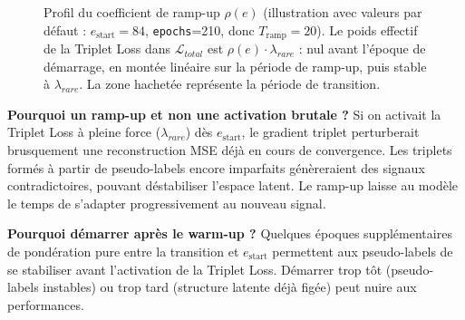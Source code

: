 \documentclass[11pt,a4paper]{article}
\begin{document}
\begin{figure}[H]
{%
}
\caption{Profil du coefficient de ramp-up $\rho(e)$ (illustration avec valeurs par d\'efaut : $e_{\text{start}}=84$, \texttt{epochs}=210, donc $T_{\text{ramp}}=20$). Le poids effectif de la Triplet Loss dans $\mathcal{L}_{total}$ est $\rho(e)\cdot\lambda_{rare}$ : nul avant l'\'epoque de d\'emarrage, en mont\'ee lin\'eaire sur la p\'eriode de ramp-up, puis stable \`a $\lambda_{rare}$. La zone hachet\'ee repr\'esente la p\'eriode de transition.}
\label{fig:rampup}
\end{figure}

\textbf{Pourquoi un ramp-up et non une activation brutale ?} Si on activait la Triplet Loss \`a pleine force ($\lambda_{rare}$) d\`es $e_{\text{start}}$, le gradient triplet perturberait brusquement une reconstruction MSE d\'ej\`a en cours de convergence. Les triplets form\'es \`a partir de pseudo-labels encore imparfaits g\'en\`ereraient des signaux contradictoires, pouvant d\'estabiliser l'espace latent. Le ramp-up laisse au mod\`ele le temps de s'adapter progressivement au nouveau signal.

\textbf{Pourquoi d\'emarrer apr\`es le warm-up ?} Quelques \'epoques suppl\'ementaires de pond\'eration pure entre la transition et $e_{\text{start}}$ permettent aux pseudo-labels de se stabiliser avant l'activation de la Triplet Loss. D\'emarrer trop t\^ot (pseudo-labels instables) ou trop tard (structure latente d\'ej\`a fig\'ee) peut nuire aux performances.
\end{document}
